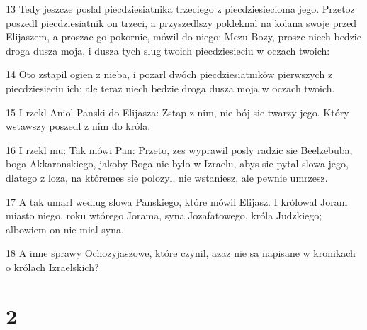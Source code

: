 \par 13 Tedy jeszcze poslal piecdziesiatnika trzeciego z piecdziesiecioma jego. Przetoz poszedl piecdziesiatnik on trzeci, a przyszedlszy pokleknal na kolana swoje przed Elijaszem, a proszac go pokornie, mówil do niego: Mezu Bozy, prosze niech bedzie droga dusza moja, i dusza tych slug twoich piecdziesieciu w oczach twoich:
\par 14 Oto zstapil ogien z nieba, i pozarl dwóch piecdziesiatników pierwszych z piecdziesieciu ich; ale teraz niech bedzie droga dusza moja w oczach twoich.
\par 15 I rzekl Aniol Panski do Elijasza: Zstap z nim, nie bój sie twarzy jego. Który wstawszy poszedl z nim do króla.
\par 16 I rzekl mu: Tak mówi Pan: Przeto, zes wyprawil posly radzic sie Beelzebuba, boga Akkaronskiego, jakoby Boga nie bylo w Izraelu, abys sie pytal slowa jego, dlatego z loza, na któremes sie polozyl, nie wstaniesz, ale pewnie umrzesz.
\par 17 A tak umarl wedlug slowa Panskiego, które mówil Elijasz. I królowal Joram miasto niego, roku wtórego Jorama, syna Jozafatowego, króla Judzkiego; albowiem on nie mial syna.
\par 18 A inne sprawy Ochozyjaszowe, które czynil, azaz nie sa napisane w kronikach o królach Izraelskich?

\chapter{2}

